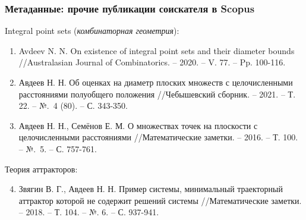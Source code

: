 \begin{frame}\frametitle{Метаданные: прочие публикации соискателя в Scopus}



	\begin{block}{Integral point sets (\textit{комбинаторная геометрия}):}
		\begin{enumerate}
			\item
				Avdeev N. N. On existence of integral point sets and their diameter bounds
				//Australasian Journal of Combinatorics. – 2020. – V. 77. – Pp. 100-116.
			\item
				Авдеев Н. Н. Об оценках на диаметр плоских множеств с целочисленными расстояниями полуобщего положения
				//Чебышевский сборник. – 2021. – Т. 22. – №.~4 (80). – С. 343-350.
			\item
				Авдеев Н. Н., Семёнов Е. М. О множествах точек на плоскости с целочисленными расстояниями
				//Математические заметки. – 2016. – Т. 100. – №.~5. – С. 757-761.
		\end{enumerate}
	\end{block}



	\begin{block}{Теория аттракторов:}
		\begin{enumerate}
			\setcounter{enumi}{3}
			\item
				Звягин В. Г., Авдеев Н. Н. Пример системы, минимальный траекторный аттрактор которой не содержит решений системы //Математические заметки. – 2018. – Т. 104. – №. 6. – С. 937-941.
		\end{enumerate}
	\end{block}

\end{frame}


